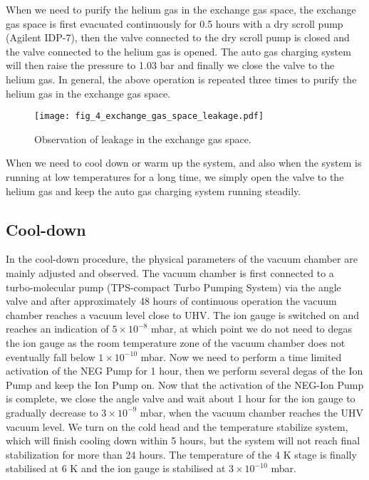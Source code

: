When we need to purify the helium gas in the exchange gas space, the exchange gas space is first evacuated continuously for 0.5 hours with a dry scroll pump (Agilent IDP-7), then the valve connected to the dry scroll pump is closed and the valve connected to the helium gas is opened. The auto gas charging system will then raise the pressure to 1.03 bar and finally we close the valve to the helium gas. In general, the above operation is repeated three times to purify the helium gas in the exchange gas space.

\begin{figure}
    \centering
    \texttt{[image: fig\_4\_exchange\_gas\_space\_leakage.pdf]}
    \caption{Observation of leakage in the exchange gas space.}
    \label{fig:fig_4_exchange_gas_space_leakage}
\end{figure}

When we need to cool down or warm up the system, and also when the system is running at low temperatures for a long time, we simply open the valve to the helium gas and keep the auto gas charging system running steadily.

\subsection{Cool-down}

In the cool-down procedure, the physical parameters of the vacuum chamber are mainly adjusted and observed. The vacuum chamber is first connected to a turbo-molecular pump (TPS-compact Turbo Pumping System) via the angle valve and after approximately 48 hours of continuous operation the vacuum chamber reaches a vacuum level close to UHV. The ion gauge is switched on and reaches an indication of $5 \times {10}^{-8}$ mbar, at which point we do not need to degas the ion gauge as the room temperature zone of the vacuum chamber does not eventually fall below $1 \times {10}^{-10}$ mbar. Now we need to perform a time limited activation of the NEG Pump for 1 hour, then we perform several degas of the Ion Pump and keep the Ion Pump on. Now that the activation of the NEG-Ion Pump is complete, we close the angle valve and wait about 1 hour for the ion gauge to gradually decrease to $3 \times {10}^{-9}$ mbar, when the vacuum chamber reaches the UHV vacuum level. We turn on the cold head and the temperature stabilize system, which will finish cooling down within 5 hours, but the system will not reach final stabilization for more than 24 hours. The temperature of the 4 K stage is finally stabilised at 6 K and the ion gauge is stabilised at $3 \times {10}^{-10}$ mbar.

